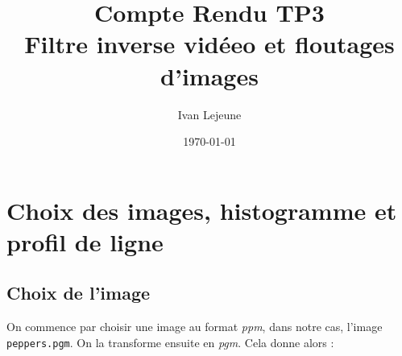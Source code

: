 \documentclass[french,a4paper,10pt]{article}
\title{Compte Rendu TP3\\Filtre inverse vidéeo et floutages d'images}
\author{Ivan Lejeune}
\date{\today}
\begin{document}
    \maketitle

    \tableofcontents

    \newpage
    \section{Choix des images, histogramme et profil de ligne}\label{sec:1}

    \subsection{Choix de l'image}\label{subsec:1.1}

    On commence par choisir une image au format \emph{ppm}, dans notre cas, l'image \texttt{peppers.pgm}.
    On la transforme ensuite en \emph{pgm}.
    Cela donne alors :
\end{document}
